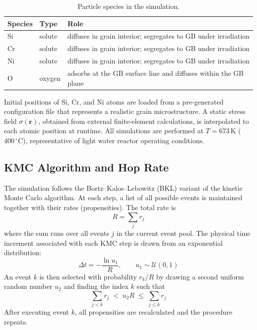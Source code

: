 \documentclass[12pt]{article}
\begin{document}
\begin{table}[h]
\centering
\caption{Particle species in the simulation.}
\label{tab:species}
\begin{tabular}{llp{7cm}}
\hline
Species & Type & Role \\
\hline
Si & solute & diffuses in grain interior; segregates to GB under irradiation \\
Cr & solute & diffuses in grain interior; segregates to GB under irradiation \\
Ni & solute & diffuses in grain interior; segregates to GB under irradiation \\
O  & oxygen & adsorbs at the GB surface line and diffuses within the GB plane \\
\hline
\end{tabular}
\end{table}

Initial positions of Si, Cr, and Ni atoms are loaded from a pre-generated configuration file that represents a realistic grain microstructure. A static stress field $\sigma(\mathbf{r})$, obtained from external finite-element calculations, is interpolated to each atomic position at runtime. All simulations are performed at $T = 673\,\mathrm{K}$ ($400\,{}^{\circ}\mathrm{C}$), representative of light water reactor operating conditions.

\subsection{KMC Algorithm and Hop Rate} \label{sec:kmc}

The simulation follows the Bortz--Kalos--Lebowitz (BKL) variant of the kinetic Monte Carlo algorithm. At each step, a list of all possible events is maintained together with their rates (propensities). The total rate is
\begin{equation}\label{equ:totalrate}
R = \sum_{j} r_j
\end{equation}
where the sum runs over all events $j$ in the current event pool. The physical time increment associated with each KMC step is drawn from an exponential distribution:
\begin{equation}\label{equ:timestep}
\Delta t = -\frac{\ln u_1}{R}, \qquad u_1 \sim \mathcal{U}(0,1)
\end{equation}
An event $k$ is then selected with probability $r_k / R$ by drawing a second uniform random number $u_2$ and finding the index $k$ such that
\begin{equation}\label{equ:eventselect}
\sum_{j < k} r_j \;<\; u_2 R \;\leq\; \sum_{j \leq k} r_j
\end{equation}
After executing event $k$, all propensities are recalculated and the procedure repeats.
\end{document}
